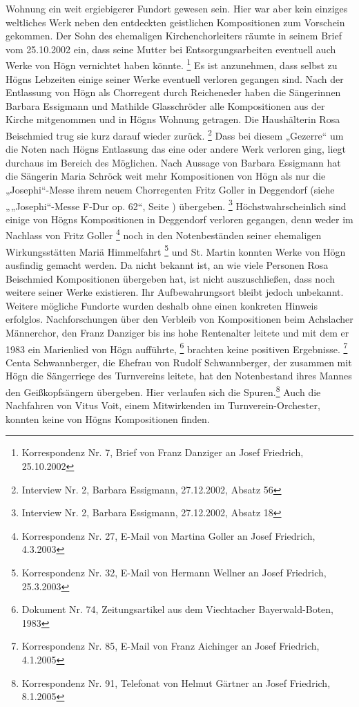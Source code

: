 Wohnung ein weit ergiebigerer Fundort gewesen sein. Hier war aber kein
einziges weltliches Werk neben den entdeckten geistlichen Kompositionen
zum Vorschein gekommen. Der Sohn des ehemaligen Kirchenchorleiters
räumte in seinem Brief vom 25.10.2002 ein, dass seine Mutter bei
Entsorgungsarbeiten eventuell auch Werke von Högn vernichtet haben
könnte. \footnote{Korrespondenz Nr. 7, Brief von Franz Danziger an
Josef Friedrich, 25.10.2002} Es ist anzunehmen, dass selbst zu Högns
Lebzeiten einige seiner Werke eventuell verloren gegangen sind. Nach
der Entlassung von Högn als Chorregent durch Reicheneder haben die
Sängerinnen Barbara Essigmann und Mathilde Glasschröder alle
Kompositionen aus der Kirche mitgenommen und in Högns Wohnung getragen.
Die Haushälterin Rosa Beischmied trug sie kurz darauf wieder
zurück. \footnote{Interview Nr. 2, Barbara Essigmann, 27.12.2002,
Absatz 56} Dass bei diesem „Gezerre“ um die Noten nach Högns Entlassung
das eine oder andere Werk verloren ging, liegt durchaus im Bereich des
Möglichen. Nach Aussage von Barbara Essigmann hat die Sängerin Maria
Schröck weit mehr Kompositionen von Högn als nur die „Josephi“-Messe
ihrem neuem Chorregenten Fritz Goller in Deggendorf (siehe
 „„Josephi“-Messe F-Dur op. 62“, Seite
) übergeben. \footnote{Interview Nr. 2,
Barbara Essigmann, 27.12.2002, Absatz 18} Höchstwahrscheinlich sind
einige von Högns Kompositionen in Deggendorf verloren gegangen, denn
weder im Nachlass von Fritz Goller \footnote{Korrespondenz Nr. 27,
E-Mail von Martina Goller an Josef Friedrich, 4.3.2003} noch in den
Notenbeständen seiner ehemaligen Wirkungsstätten Mariä
Himmelfahrt \footnote{Korrespondenz Nr. 32, E-Mail von Hermann Wellner
an Josef Friedrich, 25.3.2003} und St. Martin konnten Werke von Högn
ausfindig gemacht werden. Da nicht bekannt ist, an wie viele Personen
Rosa Beischmied Kompositionen übergeben hat, ist nicht auszuschließen,
dass noch weitere seiner Werke existieren. Ihr Aufbewahrungsort bleibt
jedoch unbekannt. Weitere mögliche Fundorte wurden deshalb ohne einen
konkreten Hinweis erfolglos. Nachforschungen über den Verbleib von
Kompositionen beim Achslacher Männerchor, den Franz Danziger bis ins
hohe Rentenalter leitete und mit dem er 1983 ein Marienlied von Högn
aufführte, \footnote{Dokument Nr. 74, Zeitungsartikel aus dem
Viechtacher Bayerwald-Boten, 1983} brachten keine positiven
Ergebnisse. \footnote{Korrespondenz Nr. 85, E-Mail von Franz Aichinger
an Josef Friedrich, 4.1.2005} Centa Schwannberger, die Ehefrau von
Rudolf Schwannberger, der zusammen mit Högn die Sängerriege des
Turnvereins leitete, hat den Notenbestand ihres Mannes den
Geißkopfsängern übergeben. Hier verlaufen sich die Spuren.\footnote{
Korrespondenz Nr. 91, Telefonat von Helmut Gärtner an Josef Friedrich,
8.1.2005} Auch die Nachfahren von Vitus Voit, einem Mitwirkenden im
Turnverein-Orchester, konnten keine von Högns Kompositionen finden.

